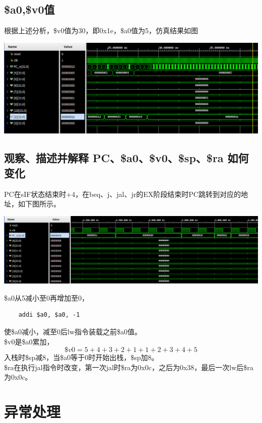 \documentclass{article}
\begin{document}
\subsection{\$a0,\$v0值}
根据上述分析，\$v0值为30，即0x1e，\$a0值为5，仿真结果如图
\begin{center}
    \includegraphics[width = 16cm]{images/sim_2_waveform.png}
\end{center}

\subsection{观察、描述并解释 PC、\$a0、\$v0、\$sp、\$ra 如何变化}
PC在sIF状态结束时+4，在beq、j、jal、jr的EX阶段结束时PC跳转到对应的地址，如下图所示。
\begin{center}
    \includegraphics[width = 16cm]{images/pc_waveform.png}
\end{center}
\$a0从5减小至0再增加至0，
\begin{lstlisting}
    addi $a0, $a0, -1
\end{lstlisting}
使\$a0减小，减至0后lw指令装载之前\$a0值。\\
\$v0是\$a0累加，
\[\$v0 = 5+4+3+2+1+1+2+3+4+5\]
入栈时\$sp减8，当\$a0等于0时开始出栈，\$sp加8。\\
\$ra在执行jal指令时改变，第一次jal时\$ra为0x0c，之后为0x38，最后一次lw后\$ra为0x0c。

\section{异常处理}

\end{document}

